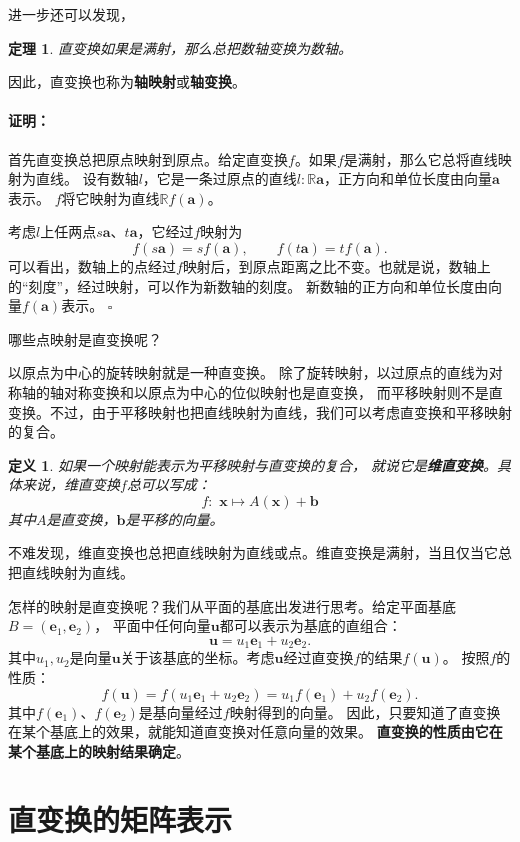 \documentclass[12pt,UTF8]{ctexbook}
\newtheorem{df}{定义}[section]
\newtheorem{tm}{定理}[section]
\renewenvironment{proof}{\paragraph{\textbf{证明：}}}{\hfill$\square$}
\begin{document}
进一步还可以发现，
\begin{tm}
    直变换如果是满射，那么总把数轴变换为数轴。
\end{tm}
因此，直变换也称为\textbf{轴映射}或\textbf{轴变换}。
\begin{proof}
    首先直变换总把原点映射到原点。给定直变换$f$。如果$f$是满射，那么它总将直线映射为直线。
    设有数轴$l$，它是一条过原点的直线$l: \mathbb{R}\mathbf{a}$，正方向和单位长度由向量$\mathbf{a}$表示。
    $f$将它映射为直线$\mathbb{R}f(\mathbf{a})$。

    考虑$l$上任两点$s\mathbf{a}$、$t\mathbf{a}$，它经过$f$映射为
    $$ f(s\mathbf{a}) = sf(\mathbf{a}),\qquad f(t\mathbf{a}) = tf(\mathbf{a}).$$
    可以看出，数轴上的点经过$f$映射后，到原点距离之比不变。也就是说，数轴上的“刻度”，经过映射，可以作为新数轴的刻度。
    新数轴的正方向和单位长度由向量$f(\mathbf{a})$表示。
\end{proof}

哪些点映射是直变换呢？

以原点为中心的旋转映射就是一种直变换。
除了旋转映射，以过原点的直线为对称轴的轴对称变换和以原点为中心的位似映射也是直变换，
而平移映射则不是直变换。不过，由于平移映射也把直线映射为直线，我们可以考虑直变换和平移映射的复合。

\begin{df}
    如果一个映射能表示为平移映射与直变换的复合，
    就说它是\textbf{维直变换}。具体来说，维直变换$f$总可以写成：
    $$ f: \,\, \mathbf{x} \mapsto A(\mathbf{x}) + \mathbf{b} $$
    其中$A$是直变换，$\mathbf{b}$是平移的向量。
\end{df}
不难发现，维直变换也总把直线映射为直线或点。维直变换是满射，当且仅当它总把直线映射为直线。

怎样的映射是直变换呢？我们从平面的基底出发进行思考。给定平面基底$B = (\mathbf{e}_1, \mathbf{e}_2)$，
平面中任何向量$\mathbf{u}$都可以表示为基底的直组合：
$$ \mathbf{u} = u_1 \mathbf{e}_1 + u_2 \mathbf{e}_2.$$
其中$u_1, u_2$是向量$\mathbf{u}$关于该基底的坐标。考虑$\mathbf{u}$经过直变换$f$的结果$f(\mathbf{u})$。
按照$f$的性质：
$$ f(\mathbf{u}) = f(u_1 \mathbf{e}_1 + u_2 \mathbf{e}_2) = u_1 f(\mathbf{e}_1) + u_2 f(\mathbf{e}_2).$$
其中$f(\mathbf{e}_1)$、$f(\mathbf{e}_2)$是基向量经过$f$映射得到的向量。
因此，只要知道了直变换在某个基底上的效果，就能知道直变换对任意向量的效果。
\textbf{直变换的性质由它在某个基底上的映射结果确定}。

\section{直变换的矩阵表示}
\end{document}
